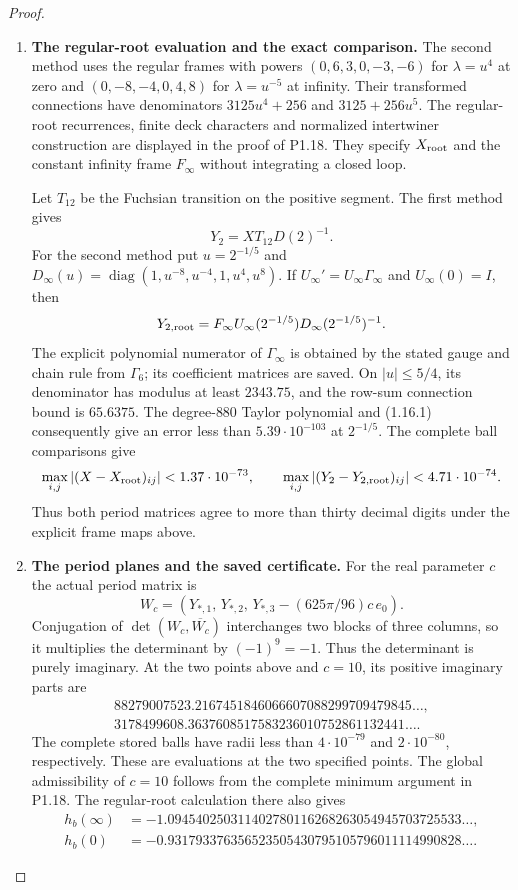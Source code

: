 \begin{proof}
\begin{enumerate}[label=\arabic*.]
\item \textbf{The regular-root evaluation and the exact comparison.}
The second method uses the regular frames with powers
$(0,6,3,0,-3,-6)$ for $\lambda=u^4$ at zero and
$(0,-8,-4,0,4,8)$ for $\lambda=u^{-5}$ at infinity.
Their transformed connections have denominators
$3125u^4+256$ and $3125+256u^5$.  The regular-root recurrences,
finite deck characters and normalized intertwiner construction
are displayed in the proof of P1.18.  They specify $X_{\rm root}$
and the constant infinity frame $F_\infty$ without integrating a
closed loop.

Let $T_{12}$ be the Fuchsian transition on the positive segment.
The first method gives
\[
 Y_2=XT_{12}D(2)^{-1}.
\]
For the second method put $u=2^{-1/5}$ and
$D_\infty(u)=\operatorname{diag}(1,u^{-8},u^{-4},1,u^4,u^8)$.
If $U_\infty'=U_\infty\Gamma_\infty$ and $U_\infty(0)=I$, then
\[
 Y_{2,\rm root}=F_\infty U_\infty(2^{-1/5})
                         D_\infty(2^{-1/5})^{-1}.
\]
The explicit polynomial numerator of $\Gamma_\infty$ is obtained
by the stated gauge and chain rule from $\Gamma_6$; its coefficient
matrices are saved.  On $|u|\le5/4$, its denominator has modulus
at least $2343.75$, and the row-sum connection bound is $65.6375$.
The degree-$880$ Taylor polynomial and (1.16.1) consequently give
an error less than $5.39\cdot10^{-103}$ at $2^{-1/5}$.
The complete ball comparisons give
\[
 \max_{i,j}|(X-X_{\rm root})_{ij}|<1.37\cdot10^{-73},\qquad
 \max_{i,j}|(Y_2-Y_{2,\rm root})_{ij}|<4.71\cdot10^{-74}.
\]
Thus both period matrices agree to more than thirty decimal digits
under the explicit frame maps above.

\item \textbf{The period planes and the saved certificate.}
For the real parameter $c$ the actual period matrix is
\[
 W_c=(Y_{*,1},\,Y_{*,2},\,Y_{*,3}-(625\pi/96)c\,e_0).
\]
Conjugation of $\det(W_c,\overline{W_c})$ interchanges two blocks
of three columns, so it multiplies the determinant by $(-1)^9=-1$.
Thus the determinant is purely imaginary.  At the two points above
and $c=10$, its positive imaginary parts are
\[
\begin{gathered}
 88279007523.2167451846066607088299709479845\ldots,\\
 3178499608.3637608517583236010752861132441\ldots .
\end{gathered}
\]
The complete stored balls have radii less than $4\cdot10^{-79}$
and $2\cdot10^{-80}$, respectively.  These are evaluations at the
two specified points.  The global admissibility of $c=10$ follows
from the complete minimum argument in P1.18.  The regular-root
calculation there also gives
\[
\begin{split}
 h_b(\infty)&=-1.094540250311402780116268263054945703725533\ldots,\\
 h_b(0)&=-0.931793376356523505430795105796011114990828\ldots .
\end{split}
\]


\end{enumerate}
\end{proof}
